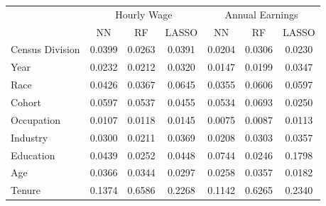 \begin{tabular}{lccc|ccc}
\hline\hline
 & \multicolumn{3}{c|}{Hourly Wage} & \multicolumn{3}{c}{Annual Earnings} \\
 & NN & RF & LASSO & NN & RF & LASSO \\
\hline
Census Division&0.0399&0.0263&0.0391&0.0204&0.0306&0.0230\\
Year&0.0232&0.0212&0.0320&0.0147&0.0199&0.0347\\
Race&0.0426&0.0367&0.0645&0.0355&0.0606&0.0597\\
Cohort&0.0597&0.0537&0.0455&0.0534&0.0693&0.0250\\
Occupation&0.0107&0.0118&0.0145&0.0075&0.0087&0.0113\\
Industry&0.0300&0.0211&0.0369&0.0208&0.0303&0.0357\\
Education&0.0439&0.0252&0.0448&0.0744&0.0246&0.1798\\
Age&0.0366&0.0344&0.0297&0.0258&0.0357&0.0182\\
Tenure&0.1374&0.6586&0.2268&0.1142&0.6265&0.2340\\
\hline\hline
\end{tabular}
